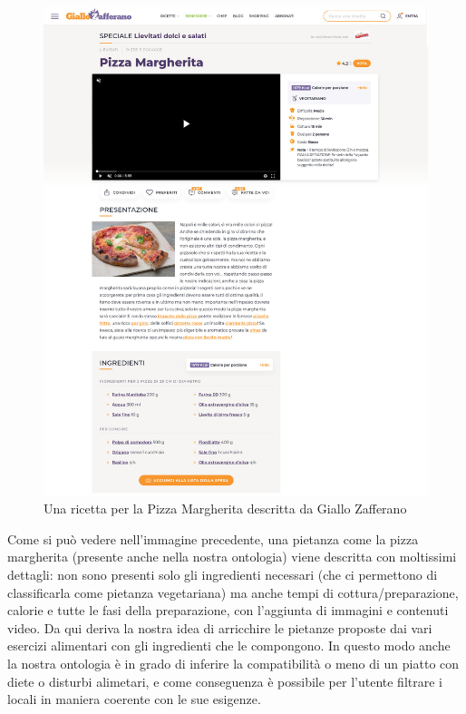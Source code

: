 \documentclass[12pt]{article}
\begin{document}
\begin{figure}[H]
    \centering
    \includegraphics[width=13cm]{files/GialloZafferano.jpg}
    \caption{Una ricetta per la Pizza Margherita descritta da Giallo Zafferano}
\end{figure}
Come si può vedere nell'immagine precedente, una pietanza come la pizza margherita (presente anche nella nostra ontologia) viene descritta con moltissimi dettagli: non sono presenti solo gli ingredienti necessari (che ci permettono di classificarla come pietanza vegetariana) ma anche tempi di cottura/preparazione, calorie e tutte le fasi della preparazione, con l'aggiunta di immagini e contenuti video.\newline
Da qui deriva la nostra idea di arricchire le pietanze proposte dai vari esercizi alimentari con gli ingredienti che le compongono. In questo modo anche la nostra ontologia è in grado di inferire la compatibilità o meno di un piatto con diete o disturbi alimetari, e come conseguenza è possibile per l'utente filtrare i locali in maniera coerente con le sue esigenze.
\par
\end{document}
